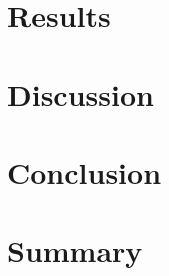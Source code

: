 \documentclass[12pt,a4paper,onecolumn]{article}
\begin{document}
\section{Results}

\section{Discussion}

\section{Conclusion}

\section{Summary}

\newpage


\end{document}
